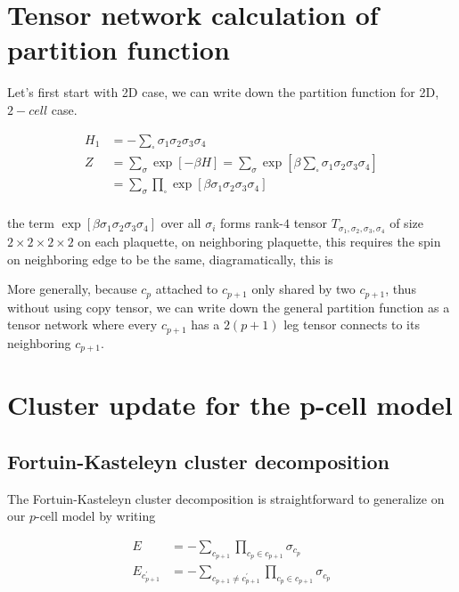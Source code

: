\documentclass[11pt]{article}
\begin{document}
\section{Tensor network calculation of partition function}

Let's first start with 2D case, we can write down the partition function for 2D, $2-cell$
case.

$$
\begin{aligned}
    H_1 &= -\sum_{\square} \sigma_1 \sigma_2 \sigma_3 \sigma_4\\
    Z &= \sum_{\sigma}\exp[-\beta H] = \sum_{\sigma}\exp[\beta \sum_{\square} \sigma_1 \sigma_2 \sigma_3 \sigma_4]\\
    &=\sum_{\sigma}\prod_{\square} \exp[\beta \sigma_1\sigma_2\sigma_3\sigma_4]\\
\end{aligned}
$$

the term $\exp[\beta \sigma_1\sigma_2\sigma_3\sigma_4]$
over all $\sigma_i$ forms rank-$4$ tensor $T_{\sigma_1,\sigma_2,\sigma_3,\sigma_4}$
of size $2\times 2\times 2\times 2$ on each plaquette,
on neighboring plaquette, this requires the spin on neighboring
edge to be the same, diagramatically, this is

\begin{figure}[h]
    \centering
    
\end{figure}

More generally, because $c_p$ attached to $c_{p+1}$ only
shared by two $c_{p+1}$, thus without using copy tensor,
we can write down the general partition function as a tensor
network where every $c_{p+1}$ has a $2(p+1)$ leg tensor
connects to its neighboring $c_{p+1}$.

\section{Cluster update for the p-cell model}

\subsection{Fortuin-Kasteleyn cluster decomposition}

The Fortuin-Kasteleyn cluster decomposition is straightforward
to generalize on our $p$-cell model by writing

\begin{equation}
    \begin{aligned}
        E &= -\sum_{c_{p+1}}\prod_{c_{p}\in c_{p+1}} \sigma_{c_p}\\
        E_{c^{\prime}_{p+1}} &= -\sum_{c_{p+1}\neq c^{\prime}_{p+1}}\prod_{c_{p}\in c_{p+1}} \sigma_{c_p}\\
    \end{aligned}
\end{equation}
\end{document}
